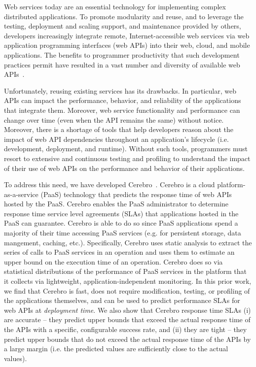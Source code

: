 Web services today are an essential technology for implementing
complex distributed applications.  To promote modularity and reuse, 
and to leverage the testing, deployment and scaling support, and maintenance 
provided by others, developers increasingly integrate remote, Internet-accessible web services 
via web application programming interfaces (web APIs)
into their web, cloud, and mobile applications.  
The benefits to programmer productivity that such development practices
permit have resulted in a vast number and diversity of available web APIs~\cite{pweb}.

Unfortunately, reusing existing services has its drawbacks. In particular, 
web APIs can impact the performance, behavior, and reliability of the applications
that integrate them.  Moreover, web service functionality and performance can change over time 
(even when the API remains the same) without notice.
Moreover, there is a shortage of tools that help developers 
reason about the impact of web API dependencies throughout an application's 
lifecycle (i.e. development, deployment, and runtime).  Without such tools, 
programmers must resort to extensive and continuous testing and profiling 
to understand the impact of their use of web APIs on the performance and behavior
of their applications.

To address this need, we have developed Cerebro~\cite{cerebro_paper}.
Cerebro is a cloud platform-as-a-service (PaaS) technology that
predicts the response time of web APIs hosted by the PaaS.
Cerebro enables the PaaS administrator to determine response time service level 
agreements (SLAs) that applications hosted in the PaaS can guarantee.  Cerebro is able to 
do so since PaaS applications spend a majority of their time accessing PaaS services
(e.g. for persistent storage, data mangement, caching, etc.). Specifically, 
Cerebro uses static analysis to extract the series of calls to PaaS services
in an operation and uses them to estimate an upper bound on the execution time of 
an operation.  Cerebro does so via statistical distributions of the performance of PaaS services
in the platform that it collects via lightweight, application-independent monitoring.
In this prior work, we find that Cerebro is fast, does not require modification,
testing, or profiling of the applications themselves, and can be used to predict 
performance SLAs for web APIs at \textit{deployment time}.
We also show that Cerebro response time SLAs 
(i) are accurate -- they predict upper bounds that exceed the actual response time of the APIs
with a specific, configurable success rate, and (ii)
they are tight -- they predict upper bounds that do not exceed the actual 
response time of the APIs by a large 
margin (i.e. the predicted values are sufficiently close to the actual values). 

